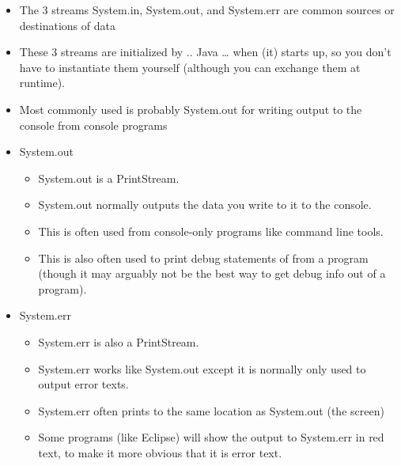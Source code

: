 \documentclass{beamer}
\begin{document}
\begin{frame}

\begin{itemize}
\item The 3 streams System.in, System.out, and System.err are common sources or destinations of data
\item These 3 streams are initialized by .. Java … when (it) starts up, so you don't have to instantiate them yourself (although you can exchange them at runtime).
\item Most commonly used is probably System.out for writing output to the console from console programs
\end{itemize}

\end{frame}\begin{frame}

\begin{itemize}
\item System.out

\begin{itemize}
\item System.out is a PrintStream. 
\item System.out normally outputs the data you write to it to the console. 
\item This is often used from console-only programs like command line tools. 
\item This is also often used to print debug statements of from a program (though it may arguably not be the best way to
get debug info out of a program).
\end{itemize}
\end{itemize}

\end{frame}\begin{frame}

\begin{itemize}
\item System.err

\begin{itemize}
\item System.err is also a PrintStream. 
\item System.err works like System.out except it is normally only used to output error texts. 
\item System.err often prints to the same location as System.out (the screen)
\item Some programs (like Eclipse) will show the output to System.err in red text, to make it more obvious that it is
error text.
\end{itemize}
\end{itemize}

\end{frame}
\end{document}
